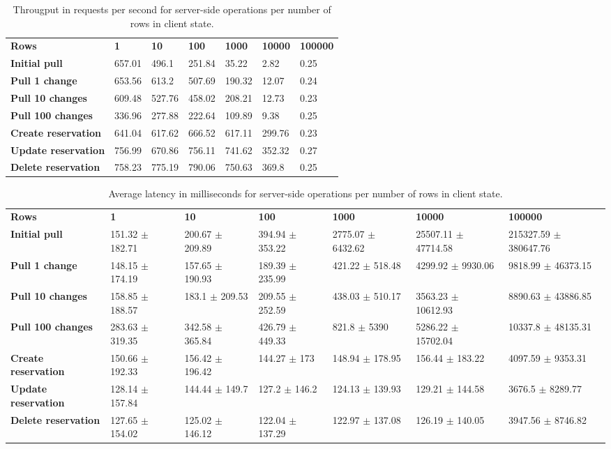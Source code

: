 
\begin{table}[H]
\centering
\begin{tabular}{lllllll}
\textbf{Rows} & \textbf{1} & \textbf{10} & \textbf{100} & \textbf{1000} & \textbf{10000} & \textbf{100000} \\
\textbf{Initial pull} & 657.01 & 496.1 & 251.84 & 35.22 & 2.82 & 0.25\\
\textbf{Pull 1 change} & 653.56 & 613.2 & 507.69 & 190.32 & 12.07 & 0.24\\
\textbf{Pull 10 changes} & 609.48 & 527.76 & 458.02 & 208.21 & 12.73 & 0.23\\
\textbf{Pull 100 changes} & 336.96 & 277.88 & 222.64 & 109.89 & 9.38 & 0.25\\
\textbf{Create reservation} & 641.04 & 617.62 & 666.52 & 617.11 & 299.76 & 0.23\\
\textbf{Update reservation} & 756.99 & 670.86 & 756.11 & 741.62 & 352.32 & 0.27\\
\textbf{Delete reservation} & 758.23 & 775.19 & 790.06 & 750.63 & 369.8 & 0.25
\end{tabular}
\caption{Througput in requests per second for server-side operations per number of rows in client state.}
\label{tab:server-relic-experiment}
\end{table}

\begin{table}[H]
\centering
\begin{tabular}{lllllll}
\textbf{Rows} & \textbf{1} & \textbf{10} & \textbf{100} & \textbf{1000} & \textbf{10000} & \textbf{100000} \\
\textbf{Initial pull} & 151.32 $\pm$ 182.71 & 200.67 $\pm$ 209.89 & 394.94 $\pm$ 353.22 & 2775.07 $\pm$ 6432.62 & 25507.11 $\pm$ 47714.58 & 215327.59 $\pm$ 380647.76\\
\textbf{Pull 1 change} & 148.15 $\pm$ 174.19 & 157.65 $\pm$ 190.93 & 189.39 $\pm$ 235.99 & 421.22 $\pm$ 518.48 & 4299.92 $\pm$ 9930.06 & 9818.99 $\pm$ 46373.15\\
\textbf{Pull 10 changes} & 158.85 $\pm$ 188.57 & 183.1 $\pm$ 209.53 & 209.55 $\pm$ 252.59 & 438.03 $\pm$ 510.17 & 3563.23 $\pm$ 10612.93 & 8890.63 $\pm$ 43886.85\\
\textbf{Pull 100 changes} & 283.63 $\pm$ 319.35 & 342.58 $\pm$ 365.84 & 426.79 $\pm$ 449.33 & 821.8 $\pm$ 5390 & 5286.22 $\pm$ 15702.04 & 10337.8 $\pm$ 48135.31\\
\textbf{Create reservation} & 150.66 $\pm$ 192.33 & 156.42 $\pm$ 196.42 & 144.27 $\pm$ 173 & 148.94 $\pm$ 178.95 & 156.44 $\pm$ 183.22 & 4097.59 $\pm$ 9353.31\\
\textbf{Update reservation} & 128.14 $\pm$ 157.84 & 144.44 $\pm$ 149.7 & 127.2 $\pm$ 146.2 & 124.13 $\pm$ 139.93 & 129.21 $\pm$ 144.58 & 3676.5 $\pm$ 8289.77\\
\textbf{Delete reservation} & 127.65 $\pm$ 154.02 & 125.02 $\pm$ 146.12 & 122.04 $\pm$ 137.29 & 122.97 $\pm$ 137.08 & 126.19 $\pm$ 140.05 & 3947.56 $\pm$ 8746.82
\end{tabular}
\caption{Average latency in milliseconds for server-side operations per number of rows in client state.}
\label{tab:server-relic-experiment-latency}
\end{table}

